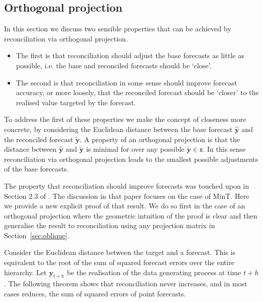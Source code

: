 \documentclass[12pt]{article}
\theoremstyle{definition}
\begin{document}
	\subsection{Orthogonal projection}\label{sec:orthogonal}
	
	In this section we discuss two sensible properties that can be achieved by reconciliation via orthogonal projection.
\begin{itemize}
  \item The  first is that reconciliation should adjust the base forecasts as little as possible, i.e. the base and reconciled forecasts should be `close'.
  \item The second is that reconciliation in some sense should improve forecast accuracy, or more loosely, that the reconciled forecast should be `closer' to the realised value targeted by the forecast.
\end{itemize}

	
	To address the first of these properties we make the concept of closeness more concrete, by considering the Euclidean distance between the base forecast $\hat{\bm{y}}$ and the reconciled forecast  $\tilde{\bm{y}}$.  A property of an orthogonal projection is that the distance between $\hat{\bm{y}}$ and $\tilde{\bm{y}}$ is minimal for over any possible $\tilde{\bm{y}}\in\mathfrak{s}$.  In this sense reconciliation via orthogonal projection leads to the smallest possible adjustments of the base forecasts.
	
	The property that reconciliation should improve forecasts was touched upon in Section 2.3 of \cite{WicEtAl2019}.  The discussion in that paper focuses on the case of MinT. Here we provide a new explicit proof of that result.  We do so first in the case of an orthogonal projection where the geometric intuition of the proof is clear and then generalise the result to reconciliation using any projection matrix in Section~\ref{sec:oblique}.
		
	Consider the Euclidean distance between the target and a forecast. This is equivalent to the root of the sum of squared forecast errors over the entire hierarchy. Let $\bm{y}_{t+h}$ be the realisation of the data generating process at time $t+h$. The following theorem shows that reconciliation never increases, and in most cases reduces, the sum of squared errors of point forecasts.
	
\end{document}

